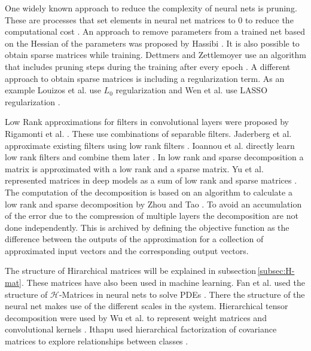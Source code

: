 \documentclass[doctype=mastersthesis,BCOR=15mm,biblatex]{ldvbook}%
\begin{document}
One widely known approach to reduce the complexity of neural nets is pruning. 
These are processes that set elements in neural net matrices to 0 to reduce the computational cost \cite{blalock_what_2020}.
An approach to remove parameters from a trained net based on the Hessian of the parameters was proposed by Hassibi \cite{hassibi_optimal_1993}.
It is also possible to obtain sparse matrices while training.
Dettmers and Zettlemoyer use an algorithm that includes pruning steps during the training after every epoch \cite{dettmers_sparse_2019}.
A different approach to obtain sparse matrices is including a regularization term.
As an example Louizos et al. use $L_0$ regularization  \cite{louizos_learning_2018} and Wen et al. use LASSO regularization \cite{wen_learning_2016}.

Low Rank approximations for filters in convolutional layers were proposed by Rigamonti et al. \cite{rigamonti_learning_2013}. These use combinations of separable filters. Jaderberg et al. approximate existing filters using low rank filters \cite{jaderberg_speeding_2014}. 
Ioannou et al. directly learn low rank filters and combine them later \cite{ioannou_training_2016}.
In low rank and sparse decomposition a matrix is approximated with a low rank and a sparse matrix. 
Yu et al. represented matrices in deep models as a sum of low rank and sparse matrices \cite{yu_compressing_2017}.
The computation of the decomposition is based on an algorithm to calculate a low rank and sparse decomposition by Zhou and Tao \cite{zhou_greedy_2013}.
To avoid an accumulation of the error due to the compression of multiple layers the decomposition are not done independently.
This is archived by defining the objective function as the difference between the outputs of the approximation for a collection of approximated input vectors and the corresponding output vectors.

The structure of Hirarchical matrices will be explained in subsection\,\ref{subsec:H-mat}. These matrices have also been used in machine learning. 
Fan et al. used the structure of $\mathcal{H}$-Matrices in neural nets to solve PDEs \cite{fan_multiscale_2019}. There the structure of the neural net makes use of the different scales in the system.
Hierarchical tensor decomposition were used by Wu et al. to represent weight matrices and convolutional kernels \cite{wu_hybrid_2020}.
Ithapu used hierarchical factorization of covariance matrices to explore relationships between classes \cite{ithapu_decoding_2017}.
\end{document}
